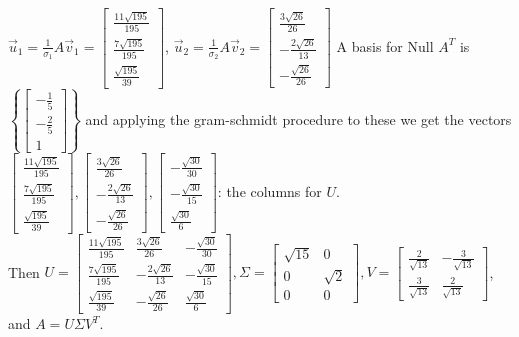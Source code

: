 \documentclass[10pt,english]{article}
\begin{document}
\begin{enumerate}
\begin{enumerate}
        $\vec{u}_1=\frac{1}{\sigma_1}A\vec{v}_1=\begin{bmatrix}\frac{11\sqrt{195}}{195}\\\frac{7\sqrt{195}}{195}\\\frac{\sqrt{195}}{39}\end{bmatrix}$, $\vec{u}_2=\frac{1}{\sigma_2}A\vec{v}_2=\begin{bmatrix}\frac{3\sqrt{26}}{26}\\-\frac{2\sqrt{26}}{13}\\-\frac{\sqrt{26}}{26}\end{bmatrix}$ A basis for $\text{Null }A^T$ is $\left\{\begin{bmatrix}-\frac{1}{5}\\-\frac{2}{5}\\1\end{bmatrix}\right\}$ and applying the gram-schmidt procedure to these we get the vectors $\begin{bmatrix}\frac{11\sqrt{195}}{195}\\\frac{7\sqrt{195}}{195}\\\frac{\sqrt{195}}{39}\end{bmatrix},\begin{bmatrix}\frac{3\sqrt{26}}{26}\\-\frac{2\sqrt{26}}{13}\\-\frac{\sqrt{26}}{26}\end{bmatrix},\begin{bmatrix}-\frac{\sqrt{30}}{30}\\-\frac{\sqrt{30}}{15}\\\frac{\sqrt{30}}{6}\end{bmatrix}$: the columns for $U$. \\
        Then $U=\begin{bmatrix}\frac{11\sqrt{195}}{195}&\frac{3\sqrt{26}}{26}&-\frac{\sqrt{30}}{30}\\\frac{7\sqrt{195}}{195}&-\frac{2\sqrt{26}}{13}&-\frac{\sqrt{30}}{15}\\\frac{\sqrt{195}}{39}&-\frac{\sqrt{26}}{26}&\frac{\sqrt{30}}{6}\end{bmatrix}, \Sigma=\begin{bmatrix}\sqrt{15}&0\\0&\sqrt{2}\\0&0\end{bmatrix}, V=\begin{bmatrix}\frac{2}{\sqrt{13}}&-\frac{3}{\sqrt{13}}\\\frac{3}{\sqrt{13}}&\frac{2}{\sqrt{13}}\end{bmatrix}$, and $A=U\Sigma V^T$. 
        

\end{enumerate}
\end{enumerate}
\end{document}

